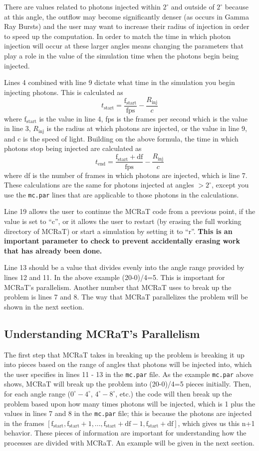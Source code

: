 \documentclass[12pt,a4paper]{article}
\begin{document}
There are values related to photons injected within $2^\circ$ and outside of $2^\circ$ because at this angle, the outflow may become significantly denser (as occurs in Gamma Ray Bursts) and the user may want to increase their radius of injection in order to speed up the computation. In order to match the time in which photon injection will occur at these larger angles means changing the parameters that play a role in the value of the simulation time when the photons begin being injected. 

Lines 4 combined with line 9 dictate what time in the simulation you begin injecting photons. This is calculated as 
\[
t_\mathrm{start}=\frac{\mathrm{f_{start}}}{\mathrm{fps}}-\frac{R_\mathrm{inj}}{c}
\]
where $\mathrm{f_{start}}$ is the value in line 4, fps is the frames per second which is the value in line 3, $R_\mathrm{inj}$ is the radius at which photons are injected, or the value in line 9, and c is the speed of light. Building on the above formula, the time in which photons stop being injected are calculated as
\[
t_\mathrm{end}=\frac{\mathrm{f_{start}}+\mathrm{df}}{\mathrm{fps}}-\frac{R_\mathrm{inj}}{c}
\]
where df is the number of frames in which photons are injected, which is line 7. These calculations are the same for photons injected at angles $> 2^\circ$, except you use the \texttt{mc.par} lines that are applicable to those photons in the calculations. 

Line 19 allows the user to continue the MCRaT code from a previous point, if the value is set to ``c'', or it allows the user to restart (by erasing the full working directory of MCRaT) or start a simulation by setting it to ``r''. {\bf This is an important parameter to check to prevent accidentally erasing work that has already been done.}

Line 13 should be a value that divides evenly into the angle range provided by lines 12 and 11. In the above example (20-0)/4=5. This is important for MCRaT's parallelism. Another number that MCRaT uses to break up the problem is lines 7 and 8. The way that MCRaT parallelizes the problem will be shown in the next section.

\subsection{Understanding MCRaT's Parallelism}
The first step that MCRaT takes in breaking up the problem is breaking it up into pieces based on the range of angles that photons will be injected into, which the user specifies in lines 11 - 13 in the \texttt{mc.par} file. As the example \texttt{mc.par} above shows, MCRaT will break up the problem into (20-0)/4=5 pieces initially. Then, for each angle range ($0^\circ-4^\circ$, $4^\circ-8^\circ$, etc.) the code will then break up the problem based upon how many times photons will be injected, which is 1 plus the values in lines 7 and 8 in the \texttt{mc.par} file; this is because the photons are injected in the frames $[\mathrm{f_{start}}, \mathrm{f_{start}}+1, ..., \mathrm{f_{start}}+\mathrm{df}-1, \mathrm{f_{start}}+\mathrm{df}]$, which gives us this n+1 behavior. These pieces of information are important for understanding how the processes are divided with MCRaT. An example will be given in the next section.
\end{document}

